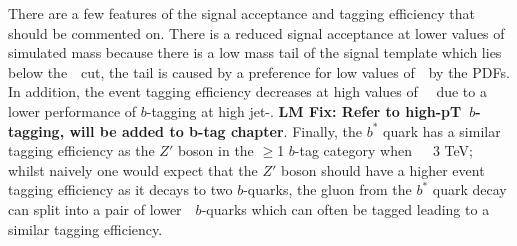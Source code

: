 There are a few features of the signal acceptance and tagging efficiency that should be commented on.
There is a reduced signal acceptance at lower values of simulated mass
because there is a low mass tail of the signal template which lies below the~\mjj~cut,
the tail is caused by a preference for low values of~\mjj~by the PDFs.
In addition, the event tagging efficiency decreases at high values of~\mjj~
due to a lower performance of $b$-tagging at high jet-\pT.
\textbf{LM Fix: Refer to high-pT~$b$-tagging, will be added to b-tag chapter}.
Finally, the $b^*$ quark has a similar tagging efficiency
as the $Z'$ boson in the $\geq$1 $b$-tag category when~\mjj~\gt~3 TeV;
whilst naively one would expect that the $Z'$ boson should have a higher
event tagging efficiency as it decays to two $b$-quarks,
the gluon from the $b^*$ quark decay can split into a pair of lower~\pT~$b$-quarks
which can often be tagged leading to a similar tagging efficiency.
